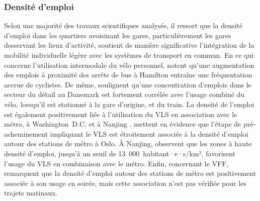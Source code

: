 \begin{refsegment}
\subsubsection*{Densité d'emploi
    \label{chap2:densite-emplois}
    }
    
Selon une majorité des travaux scientifiques analysés, il ressort que la densité d'emploi dans les quartiers avoisinant les gares, particulièrement les gares desservant les lieux d'activité, soutient de manière significative l'intégration de la mobilité individuelle légère avec les systèmes de transport en commun. En ce qui concerne l'utilisation intermodale du vélo personnel, \textcolor{blue}{\textcite[12]{zuo_promote_2020}} notent qu'une augmentation des emplois à proximité des arrêts de bus à Hamilton entraîne une fréquentation accrue de cyclistes. De même, \textcolor{blue}{\textcite[41]{nielsen_bikeability_2018}} soulignent qu'une concentration d'emplois dans le secteur du détail au Danemark est fortement corrélée avec l'usage combiné du vélo, lorsqu'il est stationné à la gare d'origine, et du train. La densité de l'emploi est également positivement liée à l'utilisation du \acrshort{VLS} en association avec le métro, à Washington~D.C. \textcolor{blue}{\autocite[7]{ma_bicycle_2015}} et à Nanjing \textcolor{blue}{\autocite[5]{cheng_comparison_2023}}. \textcolor{blue}{\textcite[397]{bocker_bike_2020}} mettent en évidence que l'étape de pré-acheminement impliquant le \acrshort{VLS} est étroitement associée à la densité d'emploi autour des stations de métro à Oslo. À Nanjing, \textcolor{blue}{\textcite[8]{cheng_promoting_2022}} observent que les zones à haute densité d'emploi, jusqu'à un seuil de 13~000~habitant·e·s/km², favorisent l'usage du \acrshort{VLS} en combinaison avec le métro. Enfin, concernant le \acrshort{VFF}, \textcolor{blue}{\textcite[181]{cheng_exploring_2022}} remarquent que la densité d'emploi autour des stations de métro est positivement associée à son usage en soirée, mais cette association n'est pas vérifiée pour les trajets matinaux.%


\end{refsegment}
